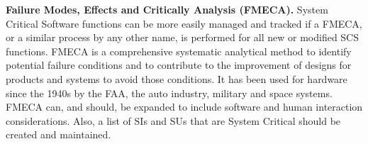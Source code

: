 \textbf{Failure Modes, Effects and Critically Analysis
(FMECA).} System Critical Software functions can be more
easily managed and tracked if a FMECA, or a similar process by any other name, is performed for all new or modified
SCS functions. FMECA is a comprehensive systematic analytical method to identify potential failure conditions and to
contribute to the improvement of designs for products and
systems to avoid those conditions. It has been used for hardware since the 1940s by the FAA, the auto industry, military
and space systems. FMECA can, and should, be expanded
to include software and human interaction considerations.
Also, a list of SIs and SUs that are System Critical should be
created and maintained.